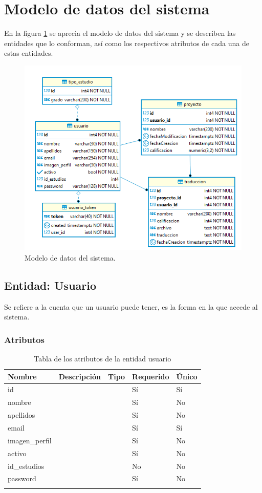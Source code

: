 \section{Modelo de datos del sistema}
En la figura \ref{fig:db} se aprecia el modelo de datos del sistema y se describen las entidades que lo conforman, así como los respectivos atributos de cada una de estas entidades.
\begin{figure}[h]
	\centering
	\includegraphics[width=\textwidth]{capitulo4/imagenes/tt_base.png}
	\caption{Modelo de datos del sistema.}
	\label{fig:db}
\end{figure}

\subsection{Entidad: Usuario}
Se refiere a la cuenta que un usuario puede tener, es la forma en la que accede al sistema.
\subsubsection{Atributos}
\begin{center}
	\begin{longtable}{|J{3cm}|J{4cm}|J{3cm}|J{2cm}|J{2cm}|}
		\hline
		\textbf{Nombre} & \textbf{Descripción} & \textbf{Tipo} & \textbf{Requerido} & \textbf{Único} \\ \hline
		id & & & Sí & Sí\\ \hline
		nombre & & & Sí & No \\ \hline
		apellidos & & & Sí & No \\ \hline
		email & & & Sí & Sí\\ \hline
		imagen\_perfil & & & Sí & No \\ \hline
		activo & & & Sí & No \\ \hline
		id\_estudios & & & No & No \\ \hline
		password & & & Sí & No \\ \hline
		\caption{Tabla de los atributos de la entidad usuario}
		\label{tbl:entidad-usuario}
	\end{longtable}
\end{center}
